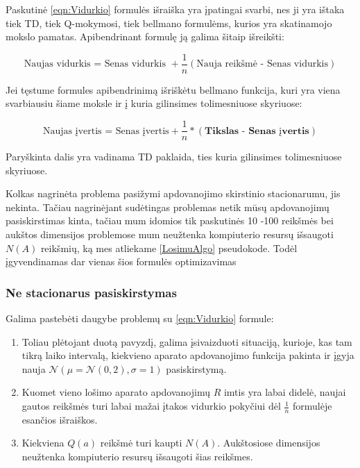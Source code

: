 \documentclass[a4paper, 12pt]{article}
\begin{document}
Paskutinė \ref{eqn:Vidurkio} formulės išraiška yra įpatingai svarbi, nes ji yra ištaka tiek TD, tiek Q-mokymosi, tiek bellmano formulėms, kurios yra skatinamojo mokslo pamatas. Apibendrinant formulę ją galima šitaip išreikšti:

\begin{equation}
\text{Naujas vidurkis = Senas vidurkis }+ \frac{1}{n} (\text{Nauja reikšmė - Senas vidurkis})
\end{equation}

Jei tęstume formules apibendrinimą išriškėtu bellmano funkcija, kuri yra viena svarbiausiu šiame moksle ir į kuria gilinsimes tolimesniuose skyriuose:

\begin{equation}
\label{TDLietuviskai}
\text{Naujas įvertis = Senas įvertis}+ \frac{1}{n} * (\textbf{Tikslas - Senas įvertis})
\end{equation}

Paryškinta dalis yra vadinama TD paklaida, ties kuria gilinsimes tolimesniuose skyriuose.

Kolkas nagrinėta problema pasižymi apdovanojimo skirstinio stacionarumu, jis nekinta. Tačiau nagrinėjant sudėtingas problemas netik mūsų apdovanojimų pasiskirstimas kinta, tačiau mum idomios tik paskutinės 10 -100 reikšmės bei aukštos dimensijos problemose mum neužtenka kompiuterio resursų išsaugoti $N(A)$ reikšmių, ką mes atliekame \ref{LosimuAlgo} pseudokode. Todėl įgyvendinamas dar vienas šios formulės optimizavimas

%
\subsubsection{Ne stacionarus pasiskirstymas}
%

Galima pastebėti daugybe problemų su \ref{eqn:Vidurkio} formule:

\begin{enumerate}
  \addtolength{\itemsep}{-0.5\baselineskip} 
  \item Toliau plėtojant duotą pavyzdį, galima įsivaizduoti situaciją, kurioje, kas tam tikrą laiko intervalą, kiekvieno aparato apdovanojimo funkcija pakinta ir įgyja nauja $\mathcal{N}(\mu=\mathcal{N}(0,2),\sigma=1)$ pasiskirstymą.
  \item Kuomet vieno lošimo aparato apdovanojimų $R$ imtis yra labai didelė, naujai gautos reikšmės turi labai mažai įtakos vidurkio pokyčiui dėl $\frac{1}{n}$ formulėje esančios išraiškos.
  \item Kiekviena $Q(a)$ reikšmė turi kaupti $N(A)$. Aukštosiose dimensijos neužtenka kompiuterio resursų išsaugoti šias reikšmes.
\end{enumerate}
\end{document}
